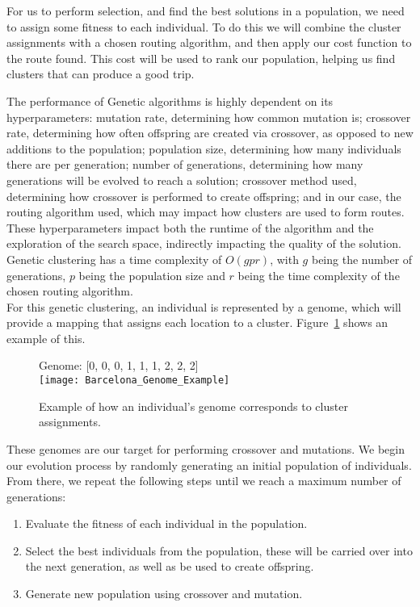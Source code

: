 For us to perform selection, and find the best solutions in a population, we need to assign some fitness to each
individual.
To do this we will combine the cluster assignments with a chosen routing algorithm, and then apply our cost function
to the route found.
This cost will be used to rank our population, helping us find clusters that can produce a good trip.

The performance of Genetic algorithms is highly dependent on its hyperparameters: mutation rate, determining how
common mutation is; crossover rate, determining how often offspring are created via crossover, as opposed to new
additions to the population; population size, determining how many individuals there are per generation; number of
generations, determining how many generations will be evolved to reach a solution; crossover method used,
determining how crossover is performed to create offspring; and in our case, the routing algorithm used, which may
impact how clusters are used to form routes.
These hyperparameters impact both the runtime of the algorithm and the exploration of the search space, indirectly
impacting the quality of the solution.
Genetic clustering has a time complexity of $O(gpr)$, with $g$ being the number of generations, $p$ being the
population size and $r$ being the time complexity of the chosen routing algorithm.\\

\noindent
For this genetic clustering, an individual is represented by a genome, which will provide a mapping that assigns each
location to a cluster.
Figure~\ref{fig:barcelona-genome-example} shows an example of this.
\begin{figure}[H]
    \centering
    Genome: [0, 0, 0, 1, 1, 1, 2, 2, 2]\\
    \texttt{[image: Barcelona\_Genome\_Example]}
    \caption{Example of how an individual's genome corresponds to cluster assignments.}
    \label{fig:barcelona-genome-example}
\end{figure}

\noindent
These genomes are our target for performing crossover and mutations.
We begin our evolution process by randomly generating an initial population of individuals.
From there, we repeat the following steps until we reach a maximum number of generations:
\begin{enumerate}
    \item Evaluate the fitness of each individual in the population.
    \item Select the best individuals from the population, these will be carried over into the next generation, as
    well as be used to create offspring.
    \item Generate new population using crossover and mutation.
\end{enumerate}

